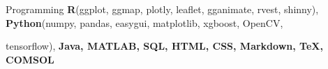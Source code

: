 

\begin{cvskills}



\cvskill
    {Programming} %
    {\textbf{R}(ggplot, ggmap, plotly, leaflet, gganimate, rvest, shinny), \textbf{Python}(numpy, pandas, easygui, matplotlib, xgboost, OpenCV, } %
    

 \cvskill
  {} %
   {tensorflow), \textbf{Java, MATLAB, SQL, HTML, CSS, Markdown, \TeX, COMSOL}} %
   


    

\end{cvskills}
